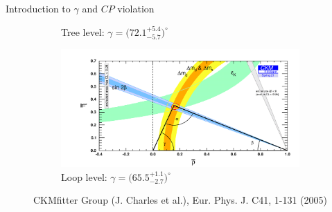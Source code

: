 \documentclass[xcolor={dvipsnames}]{beamer}
\begin{document}
\begin{frame}{Introduction to $\gamma$ and $C\!P$ violation}
\begin{figure}
\begin{subfigure}{0.5\textwidth}
      \caption{Tree level: $\gamma = \big(72.1^{+5.4}_{-5.7}\big)^\circ$}
    \end{subfigure}%
    \begin{subfigure}{0.5\textwidth}
      \centering
      \includegraphics[width = 1.0\textwidth]{Plots/ckmfitter_loop.png}
      \caption{Loop level: $\gamma = \big(65.5^{+1.1}_{-2.7}\big)^\circ$}
    \end{subfigure}
    \vspace{-0.3cm}
    \caption*{\tiny CKMfitter Group (J. Charles et al.), Eur. Phys. J. C41, 1-131 (2005)}
  \end{figure}
\end{frame}
\end{document}
